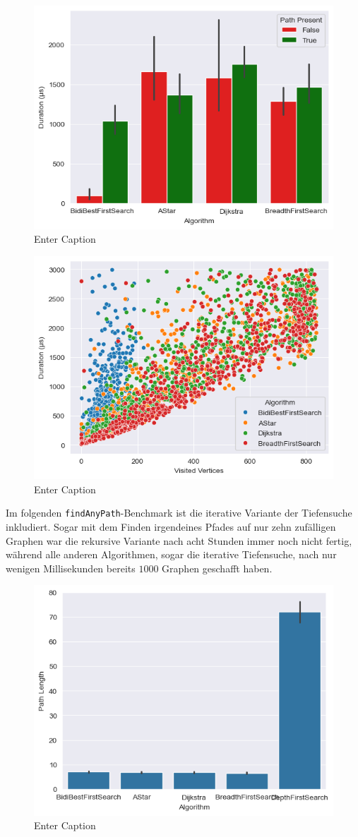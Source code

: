                 \begin{figure}
                    \centering
                    \includegraphics[width=0.5\linewidth]{images/plots/modifiable/1000/1000/1000/spf/shortest/algo_duration.png}
                    \caption{Enter Caption}
                    \label{fig:enter-label6}
                \end{figure}

                \begin{figure}
                    \centering
                    \includegraphics[width=0.5\linewidth]{images/plots/modifiable/1000/1000/1000/spf/shortest/vertices_duration.png}
                    \caption{Enter Caption}
                    \label{fig:enter-label4}
                \end{figure}

                Im folgenden \lstinline{findAnyPath}-Benchmark ist die iterative Variante der Tiefensuche inkludiert. Sogar mit dem Finden irgendeines Pfades auf nur zehn zufälligen Graphen war die rekursive Variante nach acht Stunden immer noch nicht fertig, während alle anderen Algorithmen, sogar die iterative Tiefensuche, nach nur wenigen Millisekunden bereits $1000$ Graphen geschafft haben. %

                \begin{figure}
                    \centering
                    \includegraphics[width=0.5\linewidth]{images/plots/modifiable/1000/1000/1000/iterative/any/algo_length.png}
                    \caption{Enter Caption}
                    \label{fig:enter-label3}
                \end{figure}
                
